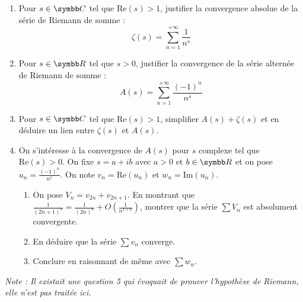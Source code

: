 \begin{exercice}
\begin{enumerate}
    \item Pour $s\in\C$ tel que $\text{Re}(s)>1$, justifier la convergence absolue de la série de Riemann de somme :
        \[\zeta(s)=\sum_{n=1}^{+ \infty}\frac{1}{n^{s}}\]

    \item Pour $s\in\R$ tel que $s>0$, justifier la convergence de la série alternée de Riemann de somme :
        \[A(s)=\sum_{n=1}^{+ \infty}\frac{(-1)^{n}}{n^{s}}\]
    
    \item  Pour $s\in\C$ tel que $\text{Re}(s)>1$, simplifier $A(s)+\zeta(s)$ et en déduire un lien entre $\zeta(s)$ et $A(s)$.
    \item On s'intéresse à la convergence de $A(s)$ pour $s$ complexe tel que $\text{Re}(s)>0$.
        On fixe $s=a+ib$ avec $a>0$ et $b\in\R$ et on pose $u_{n}=\frac{(-1)^{n}}{n^{s}}$. 
        On note $v_{n}=\text{Re}(u_{n})$ et $w_{n}=\text{Im}(u_{n})$.
    \begin{enumerate}
        \item On pose $V_{n}=v_{2n}+v_{2n+1}$. En montrant que $\frac{1}{(2n+1)^{a}}=\frac{1}{(2n)^{a}}+O\left(\frac{1}{n^{1+a}}\right)$, 
            montrer que la série $\sum V_{n}$ est absolument convergente.
        \item En déduire que la série $\sum v_{n}$ converge.
        \item Conclure en raisonnant de même avec $\sum w_{n}$.
    \end{enumerate}
\end{enumerate}
\textit{Note : Il existait une question 5 qui évoquait de prouver l'hypothèse de Riemann, elle n'est pas traitée ici.}
\end{exercice}

